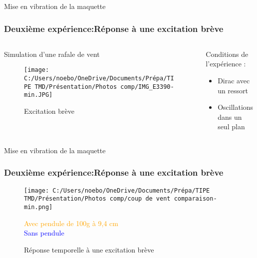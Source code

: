 \documentclass{beamer}
\begin{document}
	
	\begin{frame}{Mise en vibration de la maquette}
		\frametitle{Deuxième expérience:Réponse à une excitation brève}
		\begin{columns}
			\begin{column}{0.5\textwidth}
				\alert{Simulation d'une rafale de vent}
				\begin{figure}
					\texttt{[image: C:/Users/noebo/OneDrive/Documents/Prépa/TIPE TMD/Présentation/Photos comp/IMG\_E3390-min.JPG]}
					\caption{Excitation brève}
				\end{figure}
			\end{column}
			\begin{column}{0.5\textwidth}
				Conditions de l'expérience :
				\begin{itemize}
					\item Dirac avec un ressort 
					\item Oscillations dans un seul plan
				\end{itemize}	
			\end{column}
		\end{columns}
	\end{frame}
	
	
	
	
	\begin{frame}{Mise en vibration de la maquette}
		\frametitle{Deuxième expérience:Réponse à une excitation brève}
		\vspace{12pt}
		\begin{figure}
				\texttt{[image: C:/Users/noebo/OneDrive/Documents/Prépa/TIPE TMD/Présentation/Photos comp/coup de vent comparaison-min.png]}
				\caption{Réponse temporelle à une excitation brève}
				\tiny{\small{\textcolor{orange}{Avec pendule de 100g à 9,4 cm}\\
				\textcolor{blue}{Sans pendule}}}
			
			
	\end{figure}
	\end{frame}





	
	
	
\end{document}
